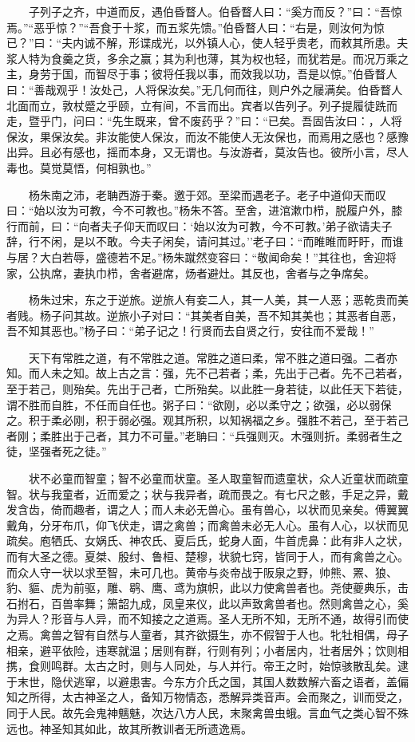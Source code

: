 　　子列子之齐，中道而反，遇伯昏瞀人。伯昏瞀人曰：``奚方而反？''曰：``吾惊焉。''``恶乎惊？''``吾食于十浆，而五浆先馈。''伯昏瞀人曰：``右是，则汝何为惊已？''曰：``夫内诚不解，形谍成光，以外镇人心，使人轻乎贵老，而敕其所患。夫浆人特为食羹之货，多余之赢；其为利也薄，其为权也轻，而犹若是。而况万乘之主，身劳于国，而智尽于事；彼将任我以事，而效我以功，吾是以惊。''伯昏瞀人曰：``善哉观乎！汝处己，人将保汝矣。''无几何而往，则户外之屦满矣。伯昏瞀人北面而立，敦杖蹙之乎颐，立有间，不言而出。宾者以告列子。列子提履徒跣而走，暨乎门，问曰：``先生既来，曾不废药乎？''曰：``已矣。吾固告汝曰：，人将保汝，果保汝矣。非汝能使人保汝，而汝不能使人无汝保也，而焉用之感也？感豫出异。且必有感也，摇而本身，又无谓也。与汝游者，莫汝告也。彼所小言，尽人毒也。莫觉莫悟，何相孰也。''

　　杨朱南之沛，老聃西游于秦。邀于郊。至梁而遇老子。老子中道仰天而叹曰：``始以汝为可教，今不可教也。''杨朱不答。至舍，进涫漱巾栉，脱履户外，膝行而前，曰：``向者夫子仰天而叹曰：`始以汝为可教，今不可教。'弟子欲请夫子辞，行不闲，是以不敢。今夫子闲矣，请问其过。''老子曰：``而睢睢而盱盱，而谁与居？大白若辱，盛德若不足。''杨朱蹴然变容曰：``敬闻命矣！''其往也，舍迎将家，公执席，妻执巾栉，舍者避席，炀者避灶。其反也，舍者与之争席矣。

　　杨朱过宋，东之于逆旅。逆旅人有妾二人，其一人美，其一人恶；恶乾贵而美者贱。杨子问其故。逆旅小子对曰：``其美者自美，吾不知其美也；其恶者自恶，吾不知其恶也。''杨子曰：``弟子记之！行贤而去自贤之行，安往而不爱哉！''

　　天下有常胜之道，有不常胜之道。常胜之道曰柔，常不胜之道曰强。二者亦知。而人未之知。故上古之言：强，先不己若者；柔，先出于己者。先不己若者，至于若己，则殆矣。先出于己者，亡所殆矣。以此胜一身若徒，以此任天下若徒，谓不胜而自胜，不任而自任也。粥子曰：``欲刚，必以柔守之；欲强，必以弱保之。积于柔必刚，积于弱必强。观其所积，以知祸福之乡。强胜不若己，至于若己者刚；柔胜出于己者，其力不可量。''老聃曰：``兵强则灭。木强则折。柔弱者生之徒，坚强者死之徒。''

　　状不必童而智童；智不必童而状童。圣人取童智而遗童状，众人近童状而疏童智。状与我童者，近而爱之；状与我异者，疏而畏之。有七尺之骸，手足之异，戴发含齿，倚而趣者，谓之人；而人未必无兽心。虽有兽心，以状而见亲矣。傅翼翼戴角，分牙布爪，仰飞伏走，谓之禽兽；而禽兽未必无人心。虽有人心，以状而见疏矣。庖牺氏、女娲氏、神农氏、夏后氏，蛇身人面，牛首虎鼻：此有非人之状，而有大圣之德。夏桀、殷纣、鲁桓、楚穆，状貌七窍，皆同于人，而有禽兽之心。而众人守一状以求至智，未可几也。黄帝与炎帝战于阪泉之野，帅熊、罴、狼、豹、貙、虎为前驱，雕、鹖、鹰、鸢为旗帜，此以力使禽兽者也。尧使夔典乐，击石拊石，百兽率舞；箫韶九成，凤皇来仪，此以声致禽兽者也。然则禽兽之心，奚为异人？形音与人异，而不知接之之道焉。圣人无所不知，无所不通，故得引而使之焉。禽兽之智有自然与人童者，其齐欲摄生，亦不假智于人也。牝牡相偶，母子相亲，避平依险，违寒就温；居则有群，行则有列；小者居内，壮者居外；饮则相携，食则鸣群。太古之时，则与人同处，与人并行。帝王之时，始惊骇散乱矣。逮于末世，隐伏逃窜，以避患害。今东方介氏之国，其国人数数解六畜之语者，盖偏知之所得，太古神圣之人，备知万物情态，悉解异类音声。会而聚之，训而受之，同于人民。故先会鬼神魑魅，次达八方人民，末聚禽兽虫蛾。言血气之类心智不殊远也。神圣知其如此，故其所教训者无所遗逸焉。

